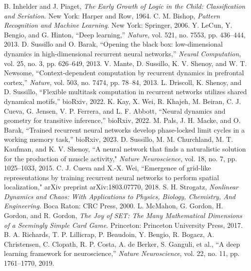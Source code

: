 \documentclass[conference]{IEEEtran}
\begin{document}
\begin{thebibliography}{00}
 B. Inhelder and J. Piaget, \textit{The Early Growth of Logic in the Child: Classification and Seriation}. New York: Harper and Row, 1964.
 C. M. Bishop, \textit{Pattern Recognition and Machine Learning}. New York: Springer, 2006.
 Y. LeCun, Y. Bengio, and G. Hinton, ``Deep learning,'' \textit{Nature}, vol. 521, no. 7553, pp. 436--444, 2013.
 D. Sussillo and O. Barak, ``Opening the black box: low-dimensional dynamics in high-dimensional recurrent neural networks,'' \textit{Neural Computation}, vol. 25, no. 3, pp. 626--649, 2013.
 V. Mante, D. Sussillo, K. V. Shenoy, and W. T. Newsome, ``Context-dependent computation by recurrent dynamics in prefrontal cortex,'' \textit{Nature}, vol. 503, no. 7474, pp. 78--84, 2013.
 L. Driscoll, K. Shenoy, and D. Sussillo, ``Flexible multitask computation in recurrent networks utilizes shared dynamical motifs,'' bioRxiv, 2022.
 K. Kay, X. Wei, R. Khajeh, M. Beiran, C. J. Cueva, G. Jensen, V. P. Ferrera, and L. F. Abbott, ``Neural dynamics and geometry for transitive inference,'' bioRxiv, 2022.
 M. Pals, J. H. Macke, and O. Barak, ``Trained recurrent neural networks develop phase-locked limit cycles in a working memory task,'' bioRxiv, 2023.
 D. Sussillo, M. M. Churchland, M. T. Kaufman, and K. V. Shenoy, ``A neural network that finds a naturalistic solution for the production of muscle activity," \textit{Nature Neuroscience}, vol. 18, no. 7, pp. 1025--1033, 2015.
 C. J. Cueva and X.-X. Wei, ``Emergence of grid-like representations by training recurrent neural networks to perform spatial localization," arXiv preprint arXiv:1803.07770, 2018.
 S. H. Strogatz, \textit{Nonlinear Dynamics and Chaos: With Applications to Physics, Biology, Chemistry, And Engineering}. Boca Raton: CRC Press, 2000.
 L. McMahon, G. Gordon, H. Gordon, and R. Gordon, \textit{The Joy of SET: The Many Mathematical Dimensions of a Seemingly Simple Card Game}. Princeton: Princeton University Press, 2017.
 B. A. Richards, T. P. Lillicrap, P. Beaudoin, Y. Bengio, R. Bogacz, A. Christensen, C. Clopath, R. P. Costa, A. de Berker, S. Ganguli, et al., ``A deep learning framework for neuroscience,'' \textit{Nature Neuroscience}, vol. 22, no. 11, pp. 1761--1770, 2019.

\end{thebibliography}
\end{document}
